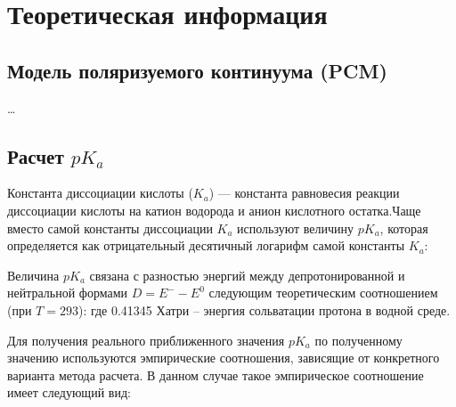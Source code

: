 \section{Теоретическая информация}
\subsection{Модель поляризуемого континуума (PCM)}
\ldots

\subsection{Расчет $pK_a$}
Константа диссоциации кислоты ($K_a$) — константа равновесия реакции диссоциации кислоты на катион водорода и анион кислотного остатка.Чаще вместо самой константы диссоциации $K_a$ используют величину $pK_a$, которая определяется как отрицательный десятичный логарифм самой константы $K_a$:

Величина $pK_a$ связана с разностью энергий между депротонированной и нейтральной формами $D = E^{-} - E^{0}$ следующим теоретическим соотношением (при $T = 293$):
где 0.41345 Хатри – энергия сольватации протона в водной среде. 

Для получения реального приближенного значения $pK_a$ по полученному значению   используются эмпирические соотношения, зависящие от конкретного варианта метода расчета. В данном случае такое эмпирическое соотношение имеет следующий вид:
 	
